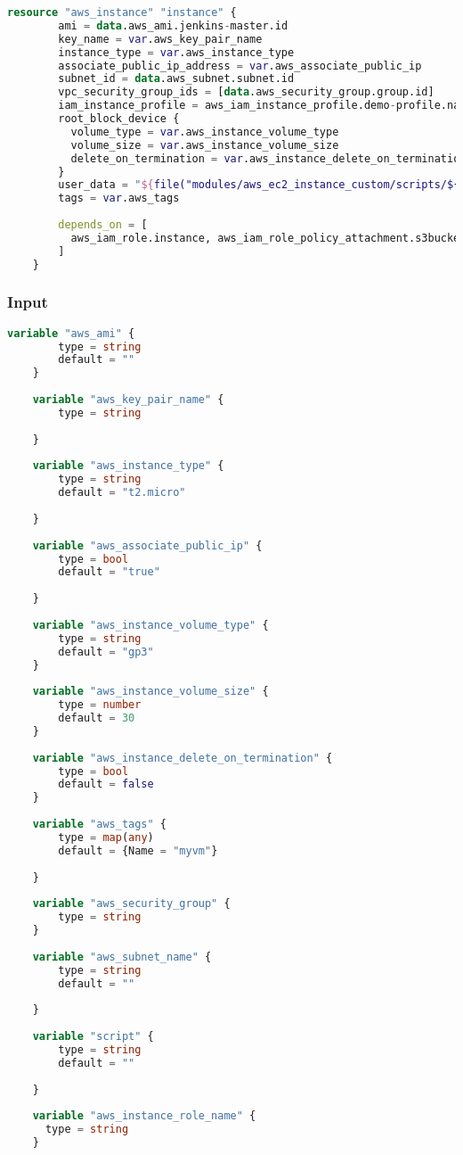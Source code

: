 \begin{lstlisting}[language=terraform]
    resource "aws_instance" "instance" {
        ami = data.aws_ami.jenkins-master.id
        key_name = var.aws_key_pair_name
        instance_type = var.aws_instance_type
        associate_public_ip_address = var.aws_associate_public_ip
        subnet_id = data.aws_subnet.subnet.id
        vpc_security_group_ids = [data.aws_security_group.group.id]
        iam_instance_profile = aws_iam_instance_profile.demo-profile.name
        root_block_device {
          volume_type = var.aws_instance_volume_type
          volume_size = var.aws_instance_volume_size
          delete_on_termination = var.aws_instance_delete_on_termination
        }
        user_data = "${file("modules/aws_ec2_instance_custom/scripts/${var.script}")}"
        tags = var.aws_tags
    
        depends_on = [
          aws_iam_role.instance, aws_iam_role_policy_attachment.s3bucketread, aws_iam_role_policy_attachment.autoscaling_group, aws_iam_role_policy_attachment.secrets_manager
        ]
    }   
\end{lstlisting}

\subsubsection{
{Input}}

\begin{lstlisting}[language=terraform]
    variable "aws_ami" {
        type = string
        default = ""
    }
    
    variable "aws_key_pair_name" {
        type = string
      
    }
    
    variable "aws_instance_type" {
        type = string
        default = "t2.micro"
      
    }
    
    variable "aws_associate_public_ip" {
        type = bool
        default = "true"
      
    }
    
    variable "aws_instance_volume_type" {
        type = string
        default = "gp3"
    }
    
    variable "aws_instance_volume_size" {
        type = number
        default = 30
    }
    
    variable "aws_instance_delete_on_termination" {
        type = bool
        default = false
    }
    
    variable "aws_tags" {
        type = map(any)
        default = {Name = "myvm"}
      
    }
    
    variable "aws_security_group" {
        type = string
    }
    
    variable "aws_subnet_name" {
        type = string
        default = ""
      
    }
    
    variable "script" {
        type = string
        default = ""
      
    }
    
    variable "aws_instance_role_name" {
      type = string
    } 
\end{lstlisting}


